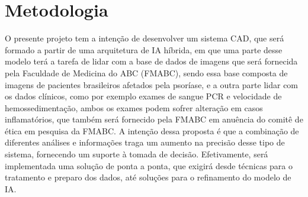\section{Metodologia}


O presente projeto tem a intenção de desenvolver um sistema CAD, que será formado a partir de uma arquitetura de IA híbrida, em que uma parte desse modelo terá a tarefa de lidar com a base de dados de imagens que será fornecida pela Faculdade de Medicina do ABC (FMABC), sendo essa base composta de imagens de pacientes brasileiros afetados pela psoríase, e a outra parte lidar com os dados clínicos, como por exemplo exames de sangue PCR e velocidade de hemossedimentação, ambos os exames podem sofrer alteração em casos inflamatórios, que também será fornecido pela FMABC em anuência do comitê de ética em pesquisa da FMABC. A intenção dessa proposta é que a combinação de diferentes análises e informações traga um aumento na precisão desse tipo de sistema, fornecendo um suporte à tomada de decisão. Efetivamente, será implementada uma solução de ponta a ponta, que exigirá desde técnicas para o tratamento e preparo dos dados, até soluções para o refinamento do modelo de IA.


